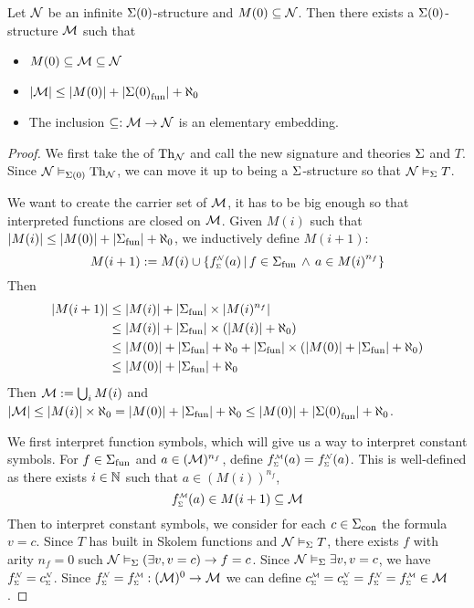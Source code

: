 \begin{prop}
    Let $\mathcal{N}$ be an infinite $\Sigma(0)$-structure and $M(0) \subseteq {\mathcal{N}}$.
    Then there exists a $\Sigma(0)$-structure $\mathcal{M}$ such that 
    \begin{itemize}
        \item $M(0) \subseteq {\mathcal{M}} \subseteq {\mathcal{N}}$
        \item $|{\mathcal{M}}| \leq |M(0)| + |{\Sigma(0)}_\mathrm{fun}| + \aleph_0$
        \item The inclusion $\subseteq : \mathcal{M} \to \mathcal{N}$ is an elementary embedding.
    \end{itemize}
\end{prop}
\begin{proof}
    We first take the  
    of $\mathrm{Th}_{\mathcal{N}}$ and call the new signature and theories 
    $\Sigma$ and $T$.
    Since $\mathcal{N} \vDash_{\Sigma(0)} \mathrm{Th}_{\mathcal{N}}$, 
    we can move it up to being a $\Sigma$-structure so that 
    $\mathcal{N} \vDash_{\Sigma} T$.

    We want to create the carrier set of $\mathcal{M}$,
    it has to be big enough so that interpreted functions are closed on $\mathcal{M}$.
    Given $M(i)$ such that $|M(i)| \leq |M(0)| + |{\Sigma}_\mathrm{fun}| + \aleph_0$, 
    we inductively define $M(i+1)$:
    \[
        M(i+1) := M(i) \cup \set{\subintp{\Si}{\NN}{f}(a) 
        \st f \in \func{\Si} \AND a \in {M(i)}^{n_f}}
    \]
    Then \begin{align*}
        |M(i+1)| &\leq |M(i)| + |{\Sigma}_\mathrm{fun}| \times |M(i)^{n_f}|\\
        &\leq |M(i)| + |{\Sigma}_\mathrm{fun}| \times (|M(i)| + \aleph_0)\\
        &\leq |M(0)| + |{\Sigma}_\mathrm{fun}| + \aleph_0 + |{\Sigma}_\mathrm{fun}| 
        \times (|M(0)| + |{\Sigma}_\mathrm{fun}| + \aleph_0)\\
        &\leq |M(0)| + |{\Sigma}_\mathrm{fun}| + \aleph_0
    \end{align*}
    Then ${\mathcal{M}} := \bigcup_{i} M(i)$ and 
    $|{\mathcal{M}}| \leq |M(i)| \times \aleph_0 =
    |M(0)| + |{\Sigma}_\mathrm{fun}| + \aleph_0 
    \leq |M(0)| + |{\Sigma(0)}_\mathrm{fun}| + \aleph_0$.

    We first interpret function symbols, 
    which will give us a way to interpret constant symbols. 
    For $f \in {\Sigma}_\mathrm{fun}$ and $a \in ({\mathcal{M}})^{n_f}$,
    define $\subintp{\Si}{\MM}{f}(a) = \subintp{\Si}{\NN}{f}(a)$.
    This is well-defined as there exists 
    $i \in \mathbb{N}$ such that $a \in (M(i))^{n_f}$,
    \[\subintp{\Si}{\MM}{f}(a) \in M(i+1) \subs {\MM}\]
    Then to interpret constant symbols,
    we consider for each $c \in {\Sigma}_\mathrm{con}$ the formula $v = c$.
    Since $T$ has built in Skolem functions and $\mathcal{N} \vDash_{\Sigma} T$, 
    there exists $f$ with arity $n_f = 0$ such
    $\mathcal{N} \vDash_{\Sigma} (\exists v, v = c) \to f = c$.
    Since $\mathcal{N} \vDash_{\Sigma} \exists v, v = c$, 
    we have $\subintp{\Si}{\NN}{f} = \subintp{\Si}{\NN}{c}$.
    Since $\subintp{\Si}{\NN}{f} = \subintp{\Si}{\MM}{f} : 
        ({\MM})^0 \to {\MM}$ 
    we can define $\subintp{\Si}{\MM}{c} = \subintp{\Si}{\NN}{c} = 
        \subintp{\Si}{\NN}{f} = \subintp{\Si}{\MM}{f} \in {\MM}$.
    

\end{proof}
